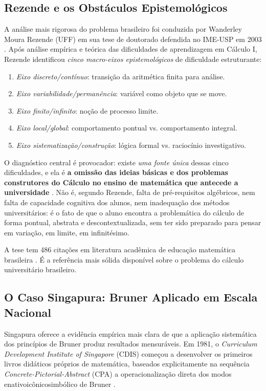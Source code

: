 \documentclass[12pt,a4paper,oneside]{article}
\begin{document}
\subsection{Rezende e os Obstáculos Epistemológicos}

A análise mais rigorosa do problema brasileiro foi conduzida por
Wanderley Moura Rezende (UFF) em sua tese de doutorado defendida
no IME-USP em 2003 \cite{ref:rezende-calculo}. Após análise empírica
e teórica das dificuldades de aprendizagem em Cálculo I, Rezende
identificou \emph{cinco macro-eixos epistemológicos} de
dificuldade estruturante:

\begin{enumerate}
\item \emph{Eixo discreto/contínuo}: transição da aritmética finita para análise.
\item \emph{Eixo variabilidade/permanência}: variável como objeto que se move.
\item \emph{Eixo finito/infinito}: noção de processo limite.
\item \emph{Eixo local/global}: comportamento pontual vs. comportamento integral.
\item \emph{Eixo sistematização/construção}: lógica formal vs. raciocínio investigativo.
\end{enumerate}

O diagnóstico central é provocador: existe \emph{uma fonte única}
dessas cinco dificuldades, e ela é \textbf{a omissão das ideias
básicas e dos problemas construtores do Cálculo no ensino de
matemática que antecede a universidade} \cite{ref:rezende-calculo}.
Não é, segundo Rezende, falta de pré-requisitos algébricos, nem
falta de capacidade cognitiva dos alunos, nem inadequação dos
métodos universitários: é o fato de que o aluno encontra a
problemática do cálculo de forma pontual, abstrata e
descontextualizada, sem ter sido preparado para pensar em variação,
em limite, em infinitésimo.

A tese tem 486 citações em literatura acadêmica de educação
matemática brasileira \cite{ref:rezende-calculo}. É a referência
mais sólida disponível sobre o problema do cálculo universitário
brasileiro.

\subsection{O Caso Singapura: Bruner Aplicado em Escala Nacional}
\label{sec:singapore-bruner}

Singapura oferece a evidência empírica mais clara de que a aplicação
sistemática dos princípios de Bruner produz resultados mensuráveis.
Em 1981, o \emph{Curriculum Development Institute of Singapore}
(CDIS) começou a desenvolver os primeiros livros didáticos próprios
de matemática, baseados explicitamente na sequência
\emph{Concrete-Pictorial-Abstract} (CPA) \textemdash{} a
operacionalização direta dos modos enativo\textendash icônico\textendash simbólico
de Bruner \cite{ref:singapore-math-wiki}.
\end{document}
